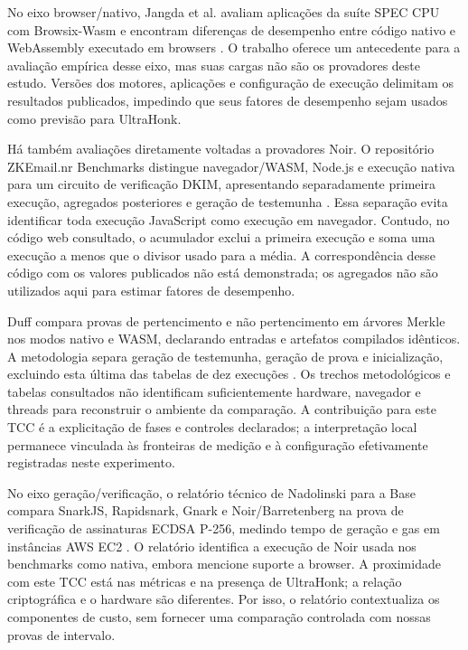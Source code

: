 No eixo browser/nativo, Jangda et al. avaliam aplicações da suíte SPEC CPU com Browsix-Wasm e encontram diferenças de desempenho entre código nativo e WebAssembly executado em browsers \cite{jangda}. O trabalho oferece um antecedente para a avaliação empírica desse eixo, mas suas cargas não são os provadores deste estudo. Versões dos motores, aplicações e configuração de execução delimitam os resultados publicados, impedindo que seus fatores de desempenho sejam usados como previsão para UltraHonk.

Há também avaliações diretamente voltadas a provadores Noir. O repositório ZKEmail.nr Benchmarks distingue navegador/WASM, Node.js e execução nativa para um circuito de verificação DKIM, apresentando separadamente primeira execução, agregados posteriores e geração de testemunha \cite{zkemailbench}. Essa separação evita identificar toda execução JavaScript como execução em navegador. Contudo, no código web consultado, o acumulador exclui a primeira execução e soma uma execução a menos que o divisor usado para a média. A correspondência desse código com os valores publicados não está demonstrada; os agregados não são utilizados aqui para estimar fatores de desempenho.

Duff compara provas de pertencimento e não pertencimento em árvores Merkle nos modos nativo e WASM, declarando entradas e artefatos compilados idênticos. A metodologia separa geração de testemunha, geração de prova e inicialização, excluindo esta última das tabelas de dez execuções \cite{duff}. Os trechos metodológicos e tabelas consultados não identificam suficientemente hardware, navegador e threads para reconstruir o ambiente da comparação. A contribuição para este TCC é a explicitação de fases e controles declarados; a interpretação local permanece vinculada às fronteiras de medição e à configuração efetivamente registradas neste experimento.

No eixo geração/verificação, o relatório técnico de Nadolinski para a Base compara SnarkJS, Rapidsnark, Gnark e Noir/Barretenberg na prova de verificação de assinaturas ECDSA P-256, medindo tempo de geração e gas em instâncias AWS EC2 \cite{basebenchmark}. O relatório identifica a execução de Noir usada nos benchmarks como nativa, embora mencione suporte a browser. A proximidade com este TCC está nas métricas e na presença de UltraHonk; a relação criptográfica e o hardware são diferentes. Por isso, o relatório contextualiza os componentes de custo, sem fornecer uma comparação controlada com nossas provas de intervalo.

